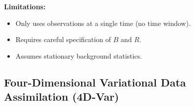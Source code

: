\documentclass[a4paper]{article}
\begin{document}
\textbf{Limitations:}\\

\begin{itemize}
  \item Only uses observations at a single time (no time window).
  \item Requires careful specification of $B$ and $R$.
  \item Assumes stationary background statistics.
\end{itemize}

\subsection{Four-Dimensional Variational Data Assimilation (4D-Var)}
\end{document}
